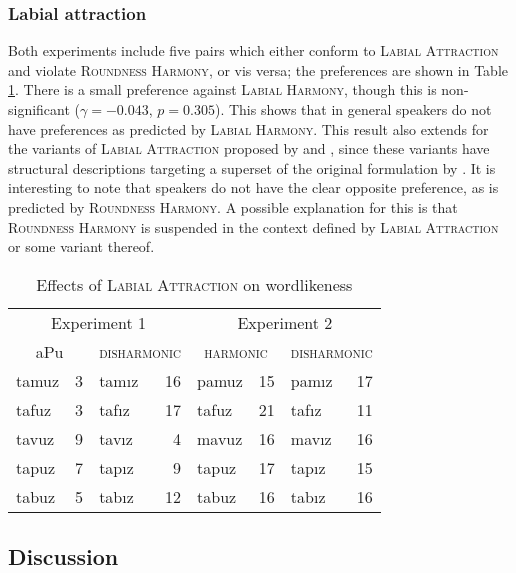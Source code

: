\subsubsection{Labial attraction}

Both experiments include five pairs which either conform to \textsc{Labial Attraction} and violate \textsc{Roundness Harmony}, or vis versa; the preferences are shown in Table \ref{law}. There is a small preference against \textsc{Labial Harmony}, though this is non-significant ($\gamma = -0.043$, $p = 0.305$). This shows that in general speakers do not have preferences as predicted by \textsc{Labial Harmony}. This result also extends for the variants of \textsc{Labial Attraction} proposed by \citet{Zimmer1969} and \citet{Inkelas2001}, since these variants have structural descriptions targeting a superset of the original formulation by \citet{Lees1966a}. It is interesting to note that speakers do not have the clear opposite preference, as is predicted by \textsc{Roundness Harmony}. A possible explanation for this is that \textsc{Roundness Harmony} is suspended in the context defined by \textsc{Labial Attraction} or some variant thereof. 

\begin{table}
\centering
\begin{tabular}{lrlr|lrlr}
\toprule
\multicolumn{4}{c|}{Experiment 1} & \multicolumn{4}{c}{Experiment 2} \\
\multicolumn{2}{c}{aPu} & \multicolumn{2}{c|}{\textsc{disharmonic}} & \multicolumn{2}{c}{\textsc{harmonic}} & \multicolumn{2}{c}{\textsc{disharmonic}} \\
\midrule
{tamuz} & 3 & {tamız} & 16 & {pamuz} & 15 & {pamız} & 17 \\
{tafuz} & 3 & {tafız} & 17 & {tafuz} & 21 & {tafız} & 11 \\
{tavuz} & 9 & {tavız} & 4  & {mavuz} & 16 & {mavız} & 16 \\
{tapuz} & 7 & {tapız} & 9  & {tapuz} & 17 & {tapız} & 15 \\
{tabuz} & 5 & {tabız} & 12 & {tabuz} & 16 & {tabız} & 16 \\
\bottomrule
\end{tabular}
\caption{Effects of \textsc{Labial Attraction} on wordlikeness \citep[from][]{Zimmer1969}}
\label{law}
\end{table}

\subsection{Discussion}

